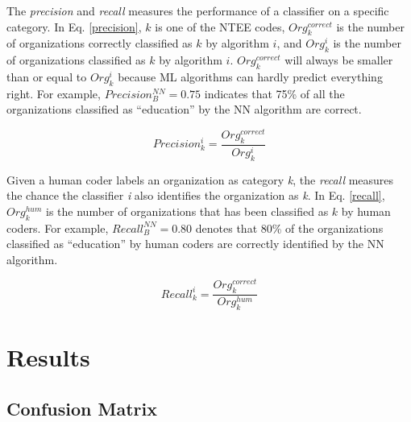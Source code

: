 \documentclass[12pt]{article}
\begin{document}
The \textit{precision} and \textit{recall} measures the performance of a classifier on a specific category. In Eq. \ref{precision}, $k$ is one of the NTEE codes, $Org^{correct}_{k}$ is the number of organizations correctly classified as $k$ by algorithm $i$, and ${Org^{i}_{k}}$ is the number of organizations classified as $k$ by algorithm $i$. $Org^{correct}_{k}$ will always be smaller than or equal to ${Org^{i}_{k}}$ because ML algorithms can hardly predict everything right. For example, $Precision^{NN}_{B}=0.75$ indicates that 75\% of all the organizations classified as ``education'' by the NN algorithm are correct.

\begin{equation} \label{precision}
    Precision^{i}_{k}=\frac{Org^{correct}_{k}}{Org^{i}_{k}}
\end{equation}

Given a human coder labels an organization as category \textit{k}, the \textit{recall} measures the chance the classifier \textit{i} also identifies the organization as \textit{k}. In Eq. \ref{recall}, $Org^{hum}_{k}$ is the number of organizations that has been classified as $k$ by human coders. For example, $Recall^{NN}_{B}=0.80$ denotes that 80\% of the organizations classified as ``education'' by human coders are correctly identified by the NN algorithm.

\begin{equation} \label{recall}
    Recall^{i}_{k}=\frac{Org^{correct}_{k}}{Org^{hum}_{k}}
\end{equation}


\section{Results}

\subsection{Confusion Matrix}



\singlespacing
\printbibliography
\end{document}

